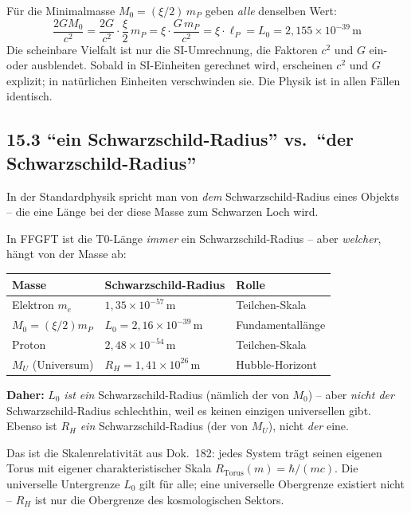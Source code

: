 Für die Minimalmasse $M_0 = (\xi/2)\,m_P$ geben \emph{alle} denselben Wert:
\[
  \frac{2G M_0}{c^2}
  = \frac{2G}{c^2}\cdot\frac{\xi}{2}\,m_P
  = \xi\cdot\frac{G\,m_P}{c^2}
  = \xi\cdot\ell_P = L_0 = 2{,}155\times10^{-39}\,\text{m}
\]
Die scheinbare Vielfalt ist nur die SI-Umrechnung, die Faktoren
$c^2$ und $G$ ein- oder ausblendet. Sobald in SI-Einheiten gerechnet
wird, erscheinen $c^2$ und $G$ explizit; in natürlichen Einheiten
verschwinden sie. Die Physik ist in allen Fällen identisch.

\subsection*{15.3 ``ein Schwarzschild-Radius'' vs.\ ``der Schwarzschild-Radius''}

In der Standardphysik spricht man von \emph{dem} Schwarzschild-Radius
eines Objekts -- die eine Länge bei der diese Masse zum Schwarzen Loch wird.

In FFGFT ist die T0-Länge \emph{immer} ein Schwarzschild-Radius --
aber \emph{welcher}, hängt von der Masse ab:

\begin{center}
\begin{tabular}{lll}
\toprule
\textbf{Masse} & \textbf{Schwarzschild-Radius} & \textbf{Rolle} \\
\midrule
Elektron $m_e$ & $1{,}35\times10^{-57}$\,m & Teilchen-Skala \\
$M_0 = (\xi/2)m_P$ & $L_0 = 2{,}16\times10^{-39}$\,m & Fundamentallänge \\
Proton & $2{,}48\times10^{-54}$\,m & Teilchen-Skala \\
$M_U$ (Universum) & $R_H = 1{,}41\times10^{26}$\,m & Hubble-Horizont \\
\bottomrule
\end{tabular}
\end{center}

\textbf{Daher:} $L_0$ \emph{ist ein} Schwarzschild-Radius
(nämlich der von $M_0$) -- aber \emph{nicht der} Schwarzschild-Radius
schlechthin, weil es keinen einzigen universellen gibt.
Ebenso ist $R_H$ \emph{ein} Schwarzschild-Radius (der von $M_U$),
nicht \emph{der} eine.

Das ist die Skalenrelativität aus Dok.~182: jedes System trägt
seinen eigenen Torus mit eigener charakteristischer Skala
$R_\mathrm{Torus}(m) = \hbar/(mc)$. Die universelle Untergrenze $L_0$
gilt für alle; eine universelle Obergrenze existiert nicht --
$R_H$ ist nur die Obergrenze des kosmologischen Sektors.

